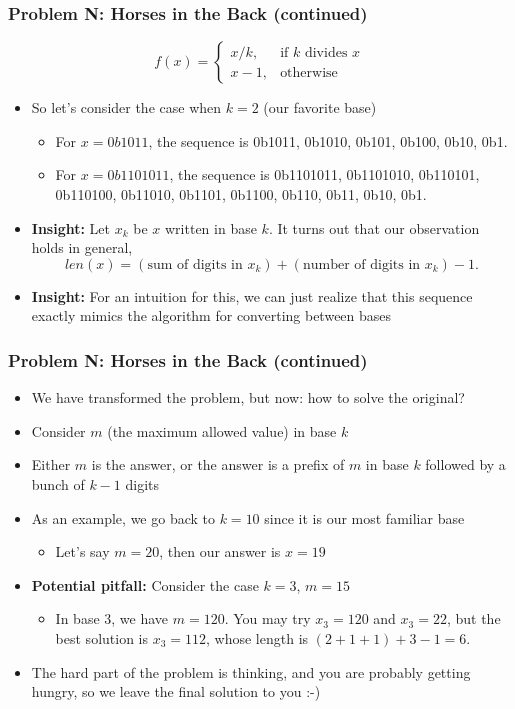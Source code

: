 \begin{frame}
  \frametitle{Problem N: Horses in the Back (continued)}
  \[ f(x) = \begin{cases} x/k, & \text{if $k$ divides $x$}\\ x-1, & \text{otherwise} \end{cases}\]
  \begin{itemize}
    \item So let's consider the case when $k=2$ (our favorite base)
      \begin{itemize}
        \item For $x=0b1011$, the sequence is 0b1011, 0b1010, 0b101, 0b100, 0b10, 0b1.
        \item For $x=0b1101011$, the sequence is 0b1101011, 0b1101010, 0b110101, 0b110100, 0b11010, 0b1101, 0b1100, 0b110, 0b11, 0b10, 0b1.
      \end{itemize}
    \item \textbf{Insight:} Let $x_k$ be $x$ written in base $k$. It turns out that our observation holds in general, \[ len(x) = (\text{sum of digits in $x_k$}) + (\text{number of digits in $x_k$}) - 1. \]
    \item \textbf{Insight:} For an intuition for this, we can just realize that this sequence exactly mimics the algorithm for converting between bases
  \end{itemize}
\end{frame}

\begin{frame}
  \frametitle{Problem N: Horses in the Back (continued)}
  \begin{itemize}
    \item We have transformed the problem, but now: how to solve the original?
    \item Consider $m$ (the maximum allowed value) in base $k$
    \item Either $m$ is the answer, or the answer is a prefix of $m$ in base $k$ followed by a bunch of $k-1$ digits
    \item As an example, we go back to $k=10$ since it is our most familiar base
      \begin{itemize}
        \item Let's say $m=20$, then our answer is $x=19$
      \end{itemize}
    \item \textbf{Potential pitfall:} Consider the case $k=3$, $m=15$
      \begin{itemize}
        \item In base 3, we have $m=120$. You may try $x_3=120$ and $x_3=22$, but the best solution is $x_3=112$, whose length is $(2+1+1)+3-1=6$.
      \end{itemize}
    \item The hard part of the problem is thinking, and you are probably getting hungry, so we leave the final solution to you :-)
  \end{itemize}
\end{frame}
